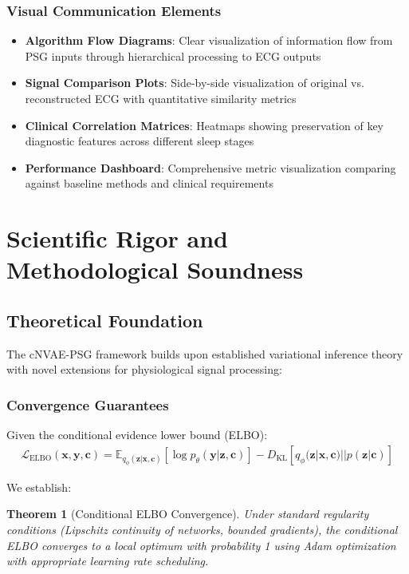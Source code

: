 \documentclass[11pt]{article}
\newtheorem{theorem}{Theorem}
\begin{document}
\subsubsection{Visual Communication Elements}
\begin{itemize}
    \item \textbf{Algorithm Flow Diagrams}: Clear visualization of information flow from PSG inputs through hierarchical processing to ECG outputs
    \item \textbf{Signal Comparison Plots}: Side-by-side visualization of original vs. reconstructed ECG with quantitative similarity metrics
    \item \textbf{Clinical Correlation Matrices}: Heatmaps showing preservation of key diagnostic features across different sleep stages
    \item \textbf{Performance Dashboard}: Comprehensive metric visualization comparing against baseline methods and clinical requirements
\end{itemize}

\section{Scientific Rigor and Methodological Soundness}
\label{sec:rigor}

\subsection{Theoretical Foundation}

The cNVAE-PSG framework builds upon established variational inference theory with novel extensions for physiological signal processing:

\subsubsection{Convergence Guarantees}
Given the conditional evidence lower bound (ELBO):
\begin{align}
\mathcal{L}_{\text{ELBO}}(\mathbf{x}, \mathbf{y}, \mathbf{c}) = \mathbb{E}_{q_\phi(\mathbf{z}|\mathbf{x}, \mathbf{c})}[\log p_\theta(\mathbf{y}|\mathbf{z}, \mathbf{c})] - D_{\text{KL}}[q_\phi(\mathbf{z}|\mathbf{x}, \mathbf{c}) || p(\mathbf{z}|\mathbf{c})]
\end{align}

We establish:
\begin{theorem}[Conditional ELBO Convergence]
Under standard regularity conditions (Lipschitz continuity of networks, bounded gradients), the conditional ELBO converges to a local optimum with probability 1 using Adam optimization with appropriate learning rate scheduling.
\end{theorem}
\end{document}
